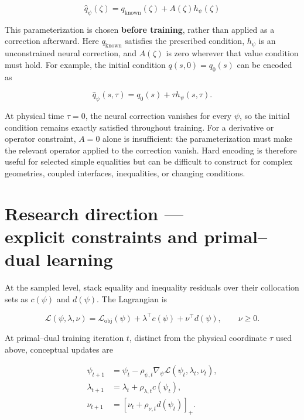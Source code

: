 \documentclass[a4paper]{article}
\begin{document}
\begin{equation}
\widehat q_\psi(\zeta)
=
q_{\mathrm{known}}(\zeta)
+
A(\zeta)h_\psi(\zeta)
\end{equation}

This parameterization is chosen \textbf{before training}, rather than applied as a
correction afterward. Here $q_{\mathrm{known}}$ satisfies the prescribed
condition, $h_\psi$ is an unconstrained neural correction, and $A(\zeta)$ is
zero wherever that value condition must hold. For example, the initial
condition $q(s,0)=q_0(s)$ can be encoded as

\begin{equation}
\widehat q_\psi(s,\tau)
=
q_0(s)+\tau h_\psi(s,\tau).
\end{equation}

At physical time $\tau=0$, the neural correction vanishes for every $\psi$,
so the initial condition remains exactly satisfied throughout training. For a
derivative or operator constraint, $A=0$ alone is insufficient: the
parameterization must make the relevant operator applied to the correction
vanish. Hard encoding is therefore useful for selected simple equalities but
can be difficult to construct for complex geometries, coupled interfaces,
inequalities, or changing conditions.

\section[Research direction --- explicit constraints and primal--dual learning]
{Research direction ---\\ explicit constraints and primal--dual learning}

At the sampled level, stack equality and inequality residuals over their
collocation sets as $c(\psi)$ and $d(\psi)$. The Lagrangian is

\begin{equation}
\mathscr L(\psi,\lambda,\nu)
=
\mathcal L_{\mathrm{obj}}(\psi)
+
\lambda^\top c(\psi)
+
\nu^\top d(\psi),
\qquad
\nu\ge0.
\end{equation}

At primal--dual training iteration $t$, distinct from the physical coordinate
$\tau$ used above, conceptual updates are

\begin{equation}
\begin{aligned}
\psi_{t+1}
&=
\psi_t
-
\rho_{\psi,t}
\nabla_\psi
\mathscr L(\psi_t,\lambda_t,\nu_t),\\
\lambda_{t+1}
&=
\lambda_t
+
\rho_{\lambda,t}c(\psi_t),\\
\nu_{t+1}
&=
\left[
\nu_t
+
\rho_{\nu,t}d(\psi_t)
\right]_+ .
\end{aligned}
\end{equation}
\end{document}
